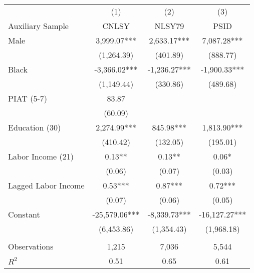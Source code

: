 \begin{tabular}{lccc} \toprule
 & (1) & (2) & (3)  \\
Auxiliary Sample & CNLSY & NLSY79  & PSID \\  \midrule 
Male & 3,999.07*** &  2,633.17***  & 7,087.28***  \\
 & (1,264.39)  & (401.89) & (888.77)  \\
Black & -3,366.02*** & -1,236.27***  & -1,900.33*** \\
 & (1,149.44)  & (330.86)& (489.68)  \\
PIAT (5-7) & 83.87 &   &    \\
 & (60.09)  &  &    \\
Education (30) & 2,274.99***  & 845.98*** & 1,813.90***  \\
 & (410.42) & (132.05)  & (195.01)  \\
Labor Income (21) & 0.13**  & 0.13** & 0.06*  \\
 & (0.06)  & (0.07)  & (0.03) \\
Lagged Labor Income  & 0.53*** & 0.87*** & 0.72***  \\
 & (0.07)  & (0.06)  & (0.05) \\
Constant & -25,579.06***  & -8,339.73*** & -16,127.27***  \\
 & (6,453.86) & (1,354.43) & (1,968.18)  \\ \\ \midrule
Observations & 1,215 & 7,036 & 5,544  \\
$R^2$  & 0.51 & 0.65 & 0.61  \\ \bottomrule
\end{tabular}
